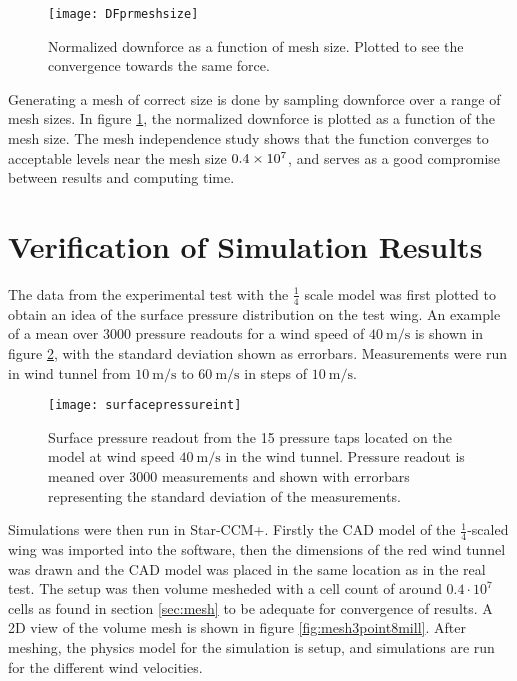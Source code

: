   \begin{figure}
    \texttt{[image: DFprmeshsize]}
    \caption{Normalized downforce as a function of mesh size. Plotted to see the convergence towards the same force.}
    \label{fig:DFprmeshsize}
  \end{figure}

  Generating a mesh of correct size is done by sampling downforce over a range of mesh sizes. In figure \ref{fig:DFprmeshsize}, the normalized downforce is plotted as a function of the mesh size. The mesh independence study shows that the function converges to acceptable levels near the mesh size $\SI{.4E7}{}$, and serves as a good compromise between results and computing time.

  \section{Verification of Simulation Results}
  \label{sec:simulationcomparison}

  The data from the experimental test with the $\frac{1}{4}$ scale model was first plotted to obtain an idea of the surface pressure distribution on the test wing. An example of a mean over 3000 pressure readouts for a wind speed of $\SI{40}{\metre\per\second}$ is shown in figure \ref{fig:surfacepressureint}, with the standard deviation shown as errorbars. Measurements were run in wind tunnel from $\SI{10}{\metre\per\second}$ to $\SI{60}{\metre\per\second}$ in steps of $\SI{10}{\metre\per\second}$.

  \begin{figure}
    \texttt{[image: surfacepressureint]}
    \caption{Surface pressure readout from the 15 pressure taps located on the model at wind speed $\SI{40}{\metre\per\second}$ in the wind tunnel. Pressure readout is meaned over 3000 measurements and shown with errorbars representing the standard deviation of the measurements.}
    \label{fig:surfacepressureint}
  \end{figure}

  Simulations were then run in Star-CCM+. Firstly the CAD model of the $\frac{1}{4}$-scaled wing was imported into the software, then the dimensions of the red wind tunnel was drawn and the CAD model was placed in the same location as in the real test. The setup was then volume mesheded with a cell count of around $0.4 \cdot 10^{7}$ cells as found in section \ref{sec:mesh} to be adequate for convergence of results. A 2D view of the volume mesh is shown in figure \ref{fig:mesh3point8mill}. After meshing, the physics model for the simulation is setup, and simulations are run for the different wind velocities.

